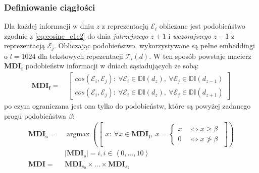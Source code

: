 \subsubsection{Definiowanie ciągłości}
Dla każdej informacji w dniu $z$ z reprezentacją $\mathcal{E}_{i}$ obliczane jest podobieństwo 
zgodnie z \ref{eq:cosine_e1e2} do dnia \textit{jutrzejszego} $z+1$ i \textit{wczorajszego} 
$z-1$ z reprezentacją $\mathcal{E}_{j}$. Obliczając podobieństwo, wykorzystywane są pełne 
embeddingi o $l=1024$ dla tekstowych repezentacji $\mathcal{T}_{i}(d)$. W ten sposób powstaje
macierz $\mathbf{MDI_f}$ podobieństw informacji w dniach sąsiadujących ze sobą:
\begin{equation}
    \begin{aligned}
        \mathbf{MDI_f} = \: & 
        \left[ 
            \begin{array}{c}
                cos(\mathcal{E}_{i}, \mathcal{E}_{j}): \: 
                    \forall \mathcal{E}_{i} \in \mathbb{DI}(d_{z}), \:
                    \forall \mathcal{E}_{j} \in \mathbb{DI}(d_{z-1})
                \\ 
                cos(\mathcal{E}_{i}, \mathcal{E}_{j}): \: 
                    \forall \mathcal{E}_{i} \in \mathbb{DI}(d_{z}), \:
                    \forall \mathcal{E}_{j} \in \mathbb{DI}(d_{z+1})
            \end{array} 
        \right]
    \end{aligned}
\end{equation}
po czym ograniczana jest ona tylko do podobieństw, które są powyżej zadanego progu podobieństwa $\beta$:
\begin{equation} \label{eq:ci_sim_matrix_cos}
    \begin{aligned}
        \mathbf{MDI_s} = \: & 
        \operatorname*{argmax} 
        \left(
            \left[ 
                \begin{array}{c}
                    x: \: \forall x \in \mathbf{MDI_f}, \: 
                    x = \begin{cases}
                        x \: & \iff x \geq \beta 
                        \\
                        0 \: & \iff x \ngtr \beta
                    \end{cases} 
                \end{array}
            \right]
        \right) 
        \\
        & |\mathbf{MDI_s}| = i, i \in \left<0, ..., 10\right>
        \\
        \mathbf{MDI} = \: & \mathbf{MDI}_{s_0} \times ... \times \mathbf{MDI}_{s_k}
    \end{aligned}
\end{equation}
